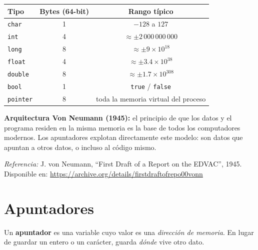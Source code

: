 \documentclass[12pt, oneside]{article}
\begin{document}
\begin{center}
\begin{tabular}{lcc}
  \toprule
  \textbf{Tipo} & \textbf{Bytes (64-bit)} & \textbf{Rango típico} \\
  \midrule
  \texttt{char}   & 1 & $-128$ a $127$ \\
  \texttt{int}    & 4 & $\approx \pm 2\,000\,000\,000$ \\
  \texttt{long}   & 8 & $\approx \pm 9 \times 10^{18}$ \\
  \texttt{float}  & 4 & $\approx \pm 3.4 \times 10^{38}$ \\
  \texttt{double} & 8 & $\approx \pm 1.7 \times 10^{308}$ \\
  \texttt{bool}   & 1 & \texttt{true} / \texttt{false} \\
  \texttt{pointer}& 8 & toda la memoria virtual del proceso \\
  \bottomrule
\end{tabular}
\end{center}

\begin{tecnico}
  \textbf{Arquitectura Von Neumann (1945):} el principio de que los datos y el
  programa residen en la misma memoria es la base de todos los computadores
  modernos. Los apuntadores explotan directamente este modelo: son datos que
  apuntan a otros datos, o incluso al código mismo. \par\smallskip
  \textit{Referencia:} J. von Neumann, ``First Draft of a Report on the EDVAC'',
  1945. Disponible en: \url{https://archive.org/details/firstdraftofrepo00vonn}
\end{tecnico}

\section{Apuntadores}

Un \textbf{apuntador} es una variable cuyo valor es una \textit{dirección de
memoria}. En lugar de guardar un entero o un carácter, guarda \textit{dónde}
vive otro dato.
\end{document}
